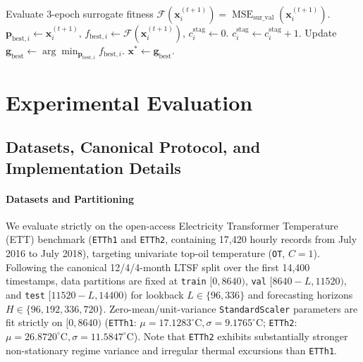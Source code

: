 \documentclass[pdflatex,sn-mathphys-num,referee,lineno]{sn-jnl}
\theoremstyle{thmstyleone}
\theoremstyle{thmstyletwo}
\theoremstyle{thmstylethree}
\begin{document}
\begin{algorithm}[htbp]
\begin{algorithmic}[1]
        \EndFor
        \State Evaluate 3-epoch surrogate fitness $\mathcal{F}(\mathbf{x}_i^{(t+1)}) = \operatorname{MSE}_{\mathrm{sur\_val}}(\mathbf{x}_i^{(t+1)})$.
            \State $\mathbf{p}_{\mathrm{best}, i} \leftarrow \mathbf{x}_i^{(t+1)}$, $f_{\mathrm{best}, i} \leftarrow \mathcal{F}(\mathbf{x}_i^{(t+1)})$, $c_i^{\mathrm{stag}} \leftarrow 0$.
        \Else
            \State $c_i^{\mathrm{stag}} \leftarrow c_i^{\mathrm{stag}} + 1$.
        \EndIf
    \EndFor
    \State Update $\mathbf{g}_{\mathrm{best}} \leftarrow \arg\min_{\mathbf{p}_{\mathrm{best}, i}} f_{\mathrm{best}, i}$.
\EndFor
\State \Return $\mathbf{x}^* \leftarrow \mathbf{g}_{\mathrm{best}}$.
\end{algorithmic}
\end{algorithm}

\section{Experimental Evaluation}\label{sec:experiments}

\subsection{Datasets, Canonical Protocol, and Implementation Details}\label{subsec:exp_setup}
\paragraph{Datasets and Partitioning}
We evaluate strictly on the open-access Electricity Transformer Temperature (ETT) benchmark \cite{zhou2021informer} (\texttt{ETTh1} and \texttt{ETTh2}, containing 17,420 hourly records from July 2016 to July 2018), targeting univariate top-oil temperature (\texttt{OT}, $C=1$). Following the canonical 12/4/4-month LTSF split over the first 14,400 timestamps, data partitions are fixed at \texttt{train} $[0, 8640)$, \texttt{val} $[8640 - L, 11520)$, and \texttt{test} $[11520 - L, 14400)$ for lookback $L \in \{96, 336\}$ and forecasting horizons $H \in \{96, 192, 336, 720\}$. Zero-mean/unit-variance \texttt{StandardScaler} parameters are fit strictly on $[0, 8640)$ (\texttt{ETTh1}: $\mu = 17.1283^\circ\mathrm{C}, \sigma = 9.1765^\circ\mathrm{C}$; \texttt{ETTh2}: $\mu = 26.8720^\circ\mathrm{C}, \sigma = 11.5847^\circ\mathrm{C}$). Note that \texttt{ETTh2} exhibits substantially stronger non-stationary regime variance and irregular thermal excursions than \texttt{ETTh1}.
\end{document}
